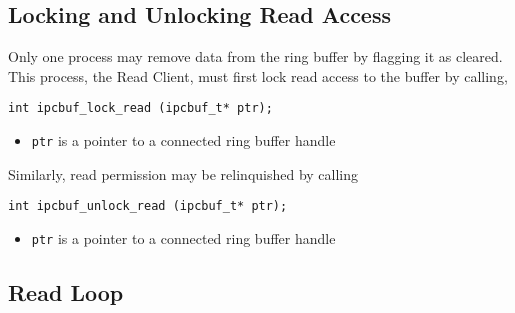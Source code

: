 \subsection{Locking and Unlocking Read Access}

Only one process may remove data from the ring buffer by flagging it
as cleared.  This process, the Read Client, must first lock read
access to the buffer by calling,
\begin{verbatim}
int ipcbuf_lock_read (ipcbuf_t* ptr);
\end{verbatim}
\vspace{-6mm}
\begin{itemize}
\item {\tt ptr} is a pointer to a connected ring buffer handle
\end{itemize}
Similarly, read permission may be relinquished by calling
\begin{verbatim}
int ipcbuf_unlock_read (ipcbuf_t* ptr);
\end{verbatim}
\vspace{-6mm}
\begin{itemize}
\item {\tt ptr} is a pointer to a connected ring buffer handle
\end{itemize}

\subsection{Read Loop}

